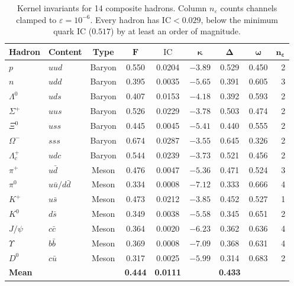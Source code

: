 \documentclass[
  aps,
  prd,
  twocolumn,
  superscriptaddress,
  nofootinbib,
  floatfix
]{revtex4-2}
\newcommand{\eps}{\varepsilon}
\newcommand{\IC}{\mathrm{IC}}
\begin{document}
\begin{table}
\caption{Kernel invariants for 14 composite hadrons.
Column $n_\eps$ counts channels clamped to $\eps = 10^{-6}$.
\textcolor{CliffRed}{Every hadron has $\IC < 0.029$}, below the
minimum quark $\IC$ ($0.517$) by at least an order of magnitude.}
\label{tab:hadrons}
\centering\small
\begin{tabular}{@{}llccccccr@{}}
\toprule
\textbf{Hadron} & \textbf{Content} & \textbf{Type} &
  $\bm{F}$ & $\bm{\IC}$ & $\bm{\kappa}$ & $\bm{\Delta}$ &
  $\bm{\omega}$ & $\bm{n_\eps}$ \\
\midrule
$p$             & $uud$                    & Baryon & 0.550 & 0.0204 & $-3.89$ & 0.529 & 0.450 & 2 \\
$n$             & $udd$                    & Baryon & 0.395 & 0.0035 & $-5.65$ & 0.391 & 0.605 & 3 \\
$\Lambda^0$     & $uds$                    & Baryon & 0.407 & 0.0153 & $-4.18$ & 0.392 & 0.593 & 2 \\
$\Sigma^+$      & $uus$                    & Baryon & 0.526 & 0.0229 & $-3.78$ & 0.503 & 0.474 & 2 \\
$\Xi^0$         & $uss$                    & Baryon & 0.445 & 0.0045 & $-5.41$ & 0.440 & 0.555 & 2 \\
$\Omega^-$      & $sss$                    & Baryon & 0.674 & 0.0287 & $-3.55$ & 0.645 & 0.326 & 2 \\
$\Lambda_c^+$   & $udc$                    & Baryon & 0.544 & 0.0239 & $-3.73$ & 0.521 & 0.456 & 2 \\
\midrule
$\pi^+$         & $u\bar{d}$               & Meson  & 0.476 & 0.0047 & $-5.36$ & 0.471 & 0.524 & 3 \\
$\pi^0$         & $u\bar{u}/d\bar{d}$      & Meson  & 0.334 & 0.0008 & $-7.12$ & 0.333 & 0.666 & 4 \\
$K^+$           & $u\bar{s}$               & Meson  & 0.473 & 0.0212 & $-3.85$ & 0.452 & 0.527 & 1 \\
$K^0$           & $d\bar{s}$               & Meson  & 0.349 & 0.0038 & $-5.58$ & 0.345 & 0.651 & 2 \\
$J/\psi$        & $c\bar{c}$               & Meson  & 0.364 & 0.0020 & $-6.23$ & 0.362 & 0.636 & 4 \\
$\Upsilon$      & $b\bar{b}$               & Meson  & 0.369 & 0.0008 & $-7.09$ & 0.368 & 0.631 & 4 \\
$D^0$           & $c\bar{u}$               & Meson  & 0.317 & 0.0025 & $-5.99$ & 0.314 & 0.683 & 2 \\
\midrule
\textbf{Mean}   &                          &        & \textbf{0.444} & \textbf{0.0111} &
  & \textbf{0.433} & & \\
\bottomrule
\end{tabular}
\end{table}
\end{document}

